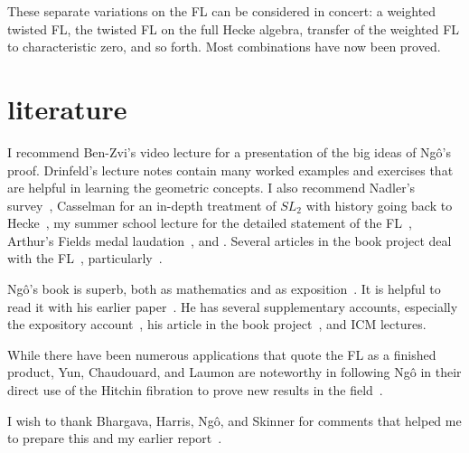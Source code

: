 \documentclass[brochure,english,12pt]{bourbaki}
\theoremstyle{plain}
\begin{document}
These separate variations on the FL can be considered in concert: a
weighted twisted FL, the twisted FL on the full Hecke algebra,
transfer of the weighted FL to characteristic zero, and so forth.
Most combinations have now been proved.

\section{literature}

I recommend Ben-Zvi's video lecture for a presentation of the big
ideas of Ng\^o's proof.  Drinfeld's lecture notes contain many worked
examples and exercises that are helpful in learning the geometric
concepts.  I also recommend Nadler's survey~\cite{Nadler:2010},
Casselman for an in-depth treatment of $SL_2$ with history going back
to Hecke~\cite{Cass:2010}, my summer school lecture for the detailed
statement of the FL~\cite{Hales:FL-statement}, Arthur's Fields medal
laudation~\cite{Arthur:2010}, and \cite{CHLaumon:2010}.  Several
articles in the book project deal with the
FL~\cite{Harris:book-project}, particularly~\cite{DN:2010}.


Ng\^o's book is superb, both as mathematics and as
exposition~\cite{NBC:2010}.  It is helpful to read it with his earlier
paper~\cite{NBC:2006}.  He has several supplementary accounts,
especially the expository account~\cite{NBC:report:2010}, his article in the book
project~\cite{NBC:abelian}, and ICM lectures.



While there have been numerous applications that quote the FL as a
finished product, Yun, Chaudouard, and Laumon are noteworthy in
following Ng\^o in their direct use of the Hitchin fibration to prove
new results in the field~\cite{Yun:2009}.


I wish to thank Bhargava, Harris, Ng\^o, and Skinner for comments that
helped me to prepare this and my earlier report~\cite{thales:NBC:2011}.
 

\raggedright

\end{document}
